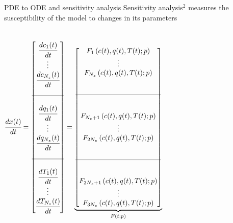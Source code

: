 \documentclass[8pt]{beamer}
\begin{document}
	\begin{frame}[fragile]{PDE to ODE and sensitivity analysis}\justifying
		Sensitivity analysis$^2$ measures the susceptibility of the model to changes in its parameters\\
		\footnotesize{
			\begin{columns}[c]
			\begin{align*}
				\cfrac{d x(t)}{d t} &= 
				\begin{bmatrix}
					\cfrac{d c_1(t)}{d t} 	  \\
					\vdots					  \\
					\cfrac{d c_{N_z}(t)}{d t} \\
					\\ \hline \\
					\cfrac{d q_1(t)}{d t} 	  \\
					\vdots					  \\
					\cfrac{d q_{N_z}(t)}{d t} \\
					\\ \hline \\
					\cfrac{d T_1(t)}{d t} 	  \\
					\vdots 					  \\
					\cfrac{d T_{N_z}(t)}{d t}
				\end{bmatrix}
				=
				\underbrace{\begin{bmatrix}
					F_1 \left( c(t),q(t),T(t); p \right)\\ 
					\vdots\\ 
					F_{N_z} \left( c(t),q(t),T(t); p \right)\\ \\
					\\ \hline \\ \\
					F_{N_z+1} \left( c(t),q(t),T(t); p \right)\\
					\vdots\\
					F_{2N_z} \left( c(t),q(t),T(t); p \right)\\ \\
					\\ \hline \\ \\
					F_{2N_z+1} \left( c(t),q(t),T(t); p \right) \\
					\vdots\\
					F_{3N_z} \left( c(t),q(t),T(t); p \right)
				\end{bmatrix}}_{F \left( t; p \right)} \\ 

\end{align*}
\end{columns}}
\end{frame}
\end{document}
